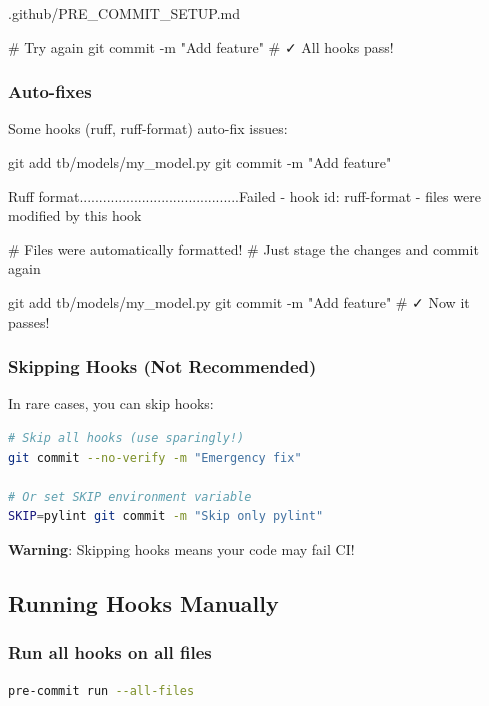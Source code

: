 \begin{relocated}{.github/PRE_COMMIT_SETUP.md}
\begin{textblock}
# Try again
git commit -m "Add feature"
# ✓ All hooks pass!
\end{textblock}

\subsubsection{Auto-fixes}\label{um:flow:pre-commit-setup:auto-fixes}

Some hooks (ruff, ruff-format) auto-fix issues:

\begin{textblock}
git add tb/models/my_model.py
git commit -m "Add feature"

Ruff format.........................................Failed
- hook id: ruff-format
- files were modified by this hook

# Files were automatically formatted!
# Just stage the changes and commit again

git add tb/models/my_model.py
git commit -m "Add feature"
# ✓ Now it passes!
\end{textblock}

\subsubsection{Skipping Hooks (Not Recommended)}\label{um:flow:pre-commit-setup:skipping-hooks-not-recommended}

In rare cases, you can skip hooks:

\begin{lstlisting}[language=bash]
# Skip all hooks (use sparingly!)
git commit --no-verify -m "Emergency fix"

# Or set SKIP environment variable
SKIP=pylint git commit -m "Skip only pylint"
\end{lstlisting}

\warn{} \textbf{Warning}: Skipping hooks means your code may fail CI!

\subsection{Running Hooks Manually}\label{um:flow:pre-commit-setup:running-hooks-manually}

\subsubsection{Run all hooks on all files}\label{um:flow:pre-commit-setup:run-all-hooks-on-all-files}

\begin{lstlisting}[language=bash]
pre-commit run --all-files
\end{lstlisting}


\end{relocated}

